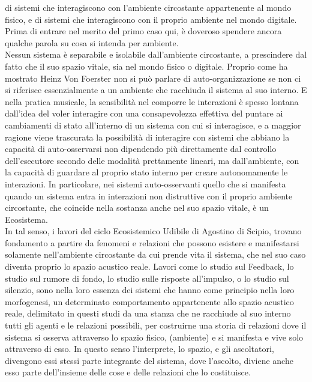 di sistemi che interagiscono con l’ambiente circostante appartenente al mondo fisico, 
e di sistemi che interagiscono con il proprio ambiente nel mondo digitale.
Prima di entrare nel merito del primo caso qui,
è doveroso spendere ancora qualche parola su cosa
si intenda per ambiente. \\
Nessun sistema è separabile e isolabile dall'ambiente circostante, 
a prescindere dal fatto che il suo spazio vitale, sia nel mondo fisico o digitale. 
Proprio come ha mostrato Heinz Von Foerster non si può parlare di auto-organizzazione
se non ci si riferisce essenzialmente a un ambiente che racchiuda il sistema al suo interno.
E nella pratica musicale, la sensibilità nel comporre le interazioni
è spesso lontana dall'idea del voler interagire con una consapevolezza effettiva del 
puntare ai cambiamenti di stato all'interno di un sistema con cui si interagisce,
e a maggior ragione viene trascurata la possibilità di interagire con sistemi che abbiano
la capacità di auto-osservarsi non dipendendo più direttamente dal controllo dell'esecutore 
secondo delle modalità prettamente lineari, 
ma dall'ambiente, 
con la capacità di guardare al proprio stato interno per creare autonomamente le interazioni.
In particolare, nei sistemi auto-osservanti quello che si manifesta quando un sistema entra in interazioni non distruttive
con il proprio ambiente circostante, che coincide nella sostanza anche nel suo spazio vitale, è un Ecosistema. \\
In tal senso, i lavori del ciclo Ecosistemico Udibile di Agostino di Scipio, 
trovano fondamento a partire da fenomeni e relazioni che possono esistere e manifestarsi solamente nell'ambiente 
circostante da cui prende vita il sistema, 
che nel suo caso diventa proprio lo spazio acustico reale. 
Lavori come lo studio sul Feedback, lo studio sul rumore di fondo, lo studio sulle risposte all'impulso, o
lo studio sul silenzio, sono nella loro essenza dei sistemi che hanno come principio 
nella loro morfogenesi, un determinato 
comportamento appartenente allo spazio acustico reale, delimitato in questi studi da una stanza
che ne racchiude al suo interno tutti gli agenti e le relazioni possibili,
per costruirne una storia di relazioni dove il sistema si osserva attraverso lo spazio fisico, 
(ambiente) e si manifesta e vive solo attraverso di esso.
In questo senso l’interprete, lo spazio, e gli ascoltatori, 
divengono essi stessi parte integrante del sistema, dove l’ascolto, diviene anche esso
parte dell’insieme delle cose e delle relazioni che lo costituisce. \\

